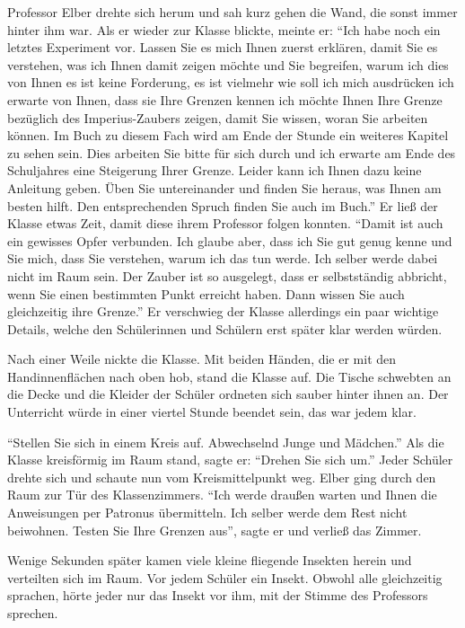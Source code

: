 Professor Elber drehte sich herum und sah kurz gehen die Wand, die sonst immer hinter ihm war. Als er wieder zur Klasse blickte, meinte er: \enquote{Ich habe noch ein letztes Experiment vor. Lassen Sie es mich Ihnen zuerst erklären, damit Sie es verstehen, was ich Ihnen damit zeigen möchte und Sie begreifen, warum ich dies von Ihnen \gst es ist keine Forderung, es ist vielmehr \gst wie soll ich mich ausdrücken \gst ich erwarte von Ihnen, dass sie Ihre Grenzen kennen \gst ich möchte Ihnen Ihre Grenze bezüglich des Imperius-Zaubers zeigen, damit Sie wissen, woran Sie arbeiten können. Im Buch zu diesem Fach wird am Ende der Stunde ein weiteres Kapitel zu sehen sein. Dies arbeiten Sie bitte für sich durch und ich erwarte am Ende des Schuljahres eine Steigerung Ihrer Grenze. Leider kann ich Ihnen dazu keine Anleitung geben. Üben Sie untereinander und finden Sie heraus, was Ihnen am besten hilft. Den entsprechenden Spruch finden Sie auch im Buch.} Er ließ der Klasse etwas Zeit, damit diese ihrem Professor folgen konnten. \enquote{Damit ist auch ein gewisses Opfer verbunden. Ich glaube aber, dass ich Sie gut genug kenne und Sie mich, dass Sie verstehen, warum ich das tun werde. Ich selber werde dabei nicht im Raum sein. Der Zauber ist so ausgelegt, dass er selbstständig abbricht, wenn Sie einen bestimmten Punkt erreicht haben. Dann wissen Sie auch gleichzeitig ihre Grenze.} Er verschwieg der Klasse allerdings ein paar wichtige Details, welche den Schülerinnen und Schülern erst später klar werden würden.

Nach einer Weile nickte die Klasse. Mit beiden Händen, die er mit den Handinnenflächen nach oben hob, stand die Klasse auf. Die Tische schwebten an die Decke und die Kleider der Schüler ordneten sich sauber hinter ihnen an. Der Unterricht würde in einer viertel Stunde beendet sein, das war jedem klar.

\enquote{Stellen Sie sich in einem Kreis auf. Abwechselnd Junge und Mädchen.} Als die Klasse kreisförmig im Raum stand, sagte er: \enquote{Drehen Sie sich um.} Jeder Schüler drehte sich und schaute nun vom Kreismittelpunkt weg. Elber ging durch den Raum zur Tür des Klassenzimmers. \enquote{Ich werde draußen warten und Ihnen die Anweisungen per Patronus übermitteln. Ich selber werde dem Rest nicht beiwohnen. Testen Sie Ihre Grenzen aus}, sagte er und verließ das Zimmer.

Wenige Sekunden später kamen viele kleine fliegende Insekten herein und verteilten sich im Raum. Vor jedem Schüler ein Insekt. Obwohl alle gleichzeitig sprachen, hörte jeder nur das Insekt vor ihm, mit der Stimme des Professors sprechen.

